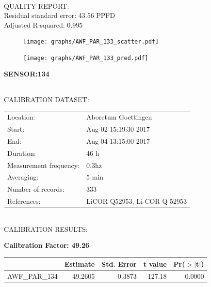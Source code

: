 \documentclass[oneside]{report}
\begin{document}
\hrulefill\\
QUALITY REPORT:\\
Residual standard error: 43.56 PPFD\\
Adjusted R-squared: 0.995



\begin{figure}[H]
  \centering
  \texttt{[image: graphs/AWF\_PAR\_133\_scatter.pdf]}
\end{figure}




\begin{figure}[H]
  \centering
  \texttt{[image: graphs/AWF\_PAR\_133\_pred.pdf]}
\end{figure}

\pagebreak


\begin{center}
\large{\textbf{SENSOR:134}}\\
\end{center}

\hrulefill\\
CALIBRATION DATASET:\\
\begin{table}[h!]
  \centering
  \label{tab:table1}
  \begin{tabular}{ll}
    Location: & Aboretum Goettingen\\ 
    
    
    Start:  & Aug 02 15:19:30 2017 \\
    End:   & Aug 04 13:15:00 2017\\ 
    Duration: & 46 h\\
    Measurement frequency: & 0.3hz\\
    Averaging:  &5 min\\
    Number of records: & 333 \\
    References: & LiCOR Q52953, Li-COR Q 52953 \\
  \end{tabular}
\end{table}

\hrulefill\\
CALIBRATION RESULTS:\\


\begin{center}
\textbf{\large{Calibration Factor: 49.26}}\\
\end{center}
\begin{table}[ht]
\centering
\begin{tabular}{rrrrr}
  \hline
 & Estimate & Std. Error & t value & Pr($>$$|$t$|$) \\ 
  \hline
AWF\_PAR\_134 & 49.2605 & 0.3873 & 127.18 & 0.0000 \\ 
   \hline
\end{tabular}
\end{table}
\end{document}
